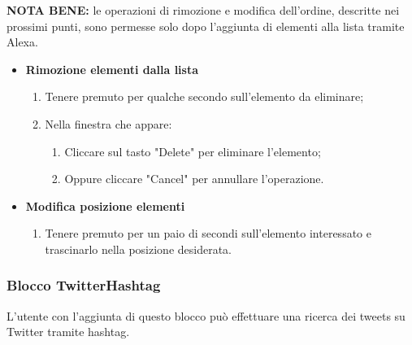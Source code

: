 \textbf{NOTA BENE:} le operazioni di rimozione e modifica dell'ordine, descritte nei prossimi punti, sono permesse solo dopo l'aggiunta di elementi alla lista tramite Alexa.
\begin{itemize}
	\item \textbf{Rimozione elementi dalla lista}
	\begin{enumerate}
		\item Tenere premuto per qualche secondo sull'elemento da eliminare;
		\item Nella finestra che appare:
		\begin{enumerate}
			\item Cliccare sul tasto "Delete" per eliminare l'elemento;
			\item Oppure cliccare "Cancel" per annullare l'operazione.
		\end{enumerate}

	\end{enumerate}
	\item \textbf{Modifica posizione elementi}
	\begin{enumerate}
		\item Tenere premuto per un paio di secondi sull'elemento interessato e trascinarlo nella posizione desiderata. 

	\end{enumerate}
\end{itemize}

\subsubsection{Blocco TwitterHashtag} \label{twitterHa}
L'utente con l'aggiunta di questo blocco può effettuare una ricerca dei tweets su Twitter tramite hashtag.

